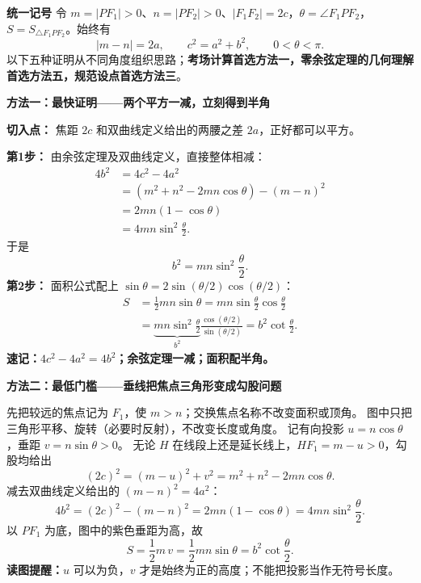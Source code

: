 \begin{proofbox}
\textbf{\textcolor{CProof}{统一记号}}
令 $m=|PF_1|>0$、$n=|PF_2|>0$、$|F_1F_2|=2c$，$\theta=\angle F_1PF_2$，$S=S_{\triangle F_1PF_2}$。始终有
\[
|m-n|=2a,\qquad c^2=a^2+b^2,\qquad 0<\theta<\pi.
\]
以下五种证明从不同角度组织思路；\textbf{考场计算首选方法一，零余弦定理的几何理解首选方法五，规范设点首选方法三}。

\medskip
\textbf{\textcolor{CProof}{方法一：最快证明——两个平方一减，立刻得到半角}}

\textbf{切入点：} 焦距 $2c$ 和双曲线定义给出的两腰之差 $2a$，正好都可以平方。

\textbf{第1步：} 由余弦定理及双曲线定义，直接整体相减：
\[
\begin{aligned}
4b^2
&=4c^2-4a^2\\
&=(m^2+n^2-2mn\cos\theta)-(m-n)^2\\
&=2mn(1-\cos\theta)\\
&=4mn\sin^2\frac{\theta}{2}.
\end{aligned}
\]
于是
\[\boxed{b^2=mn\sin^2\frac{\theta}{2}}.\]
\textbf{第2步：} 面积公式配上 $\sin\theta=2\sin(\theta/2)\cos(\theta/2)$：
\[
\begin{aligned}
S&=\tfrac12 mn\sin\theta
=mn\sin\tfrac\theta2\cos\tfrac\theta2\\
&=\underbrace{mn\sin^2\tfrac\theta2}_{b^2}
  \frac{\cos(\theta/2)}{\sin(\theta/2)}
=\boxed{b^2\cot\frac\theta2}.
\end{aligned}
\]
\textbf{速记：$4c^2-4a^2=4b^2$；余弦定理一减；面积配半角。}

\medskip
\end{proofbox}
\clearpage
\begin{proofbox}
\textbf{\textcolor{CProof}{方法二：最低门槛——垂线把焦点三角形变成勾股问题}}

先把较远的焦点记为 $F_1$，使 $m>n$；交换焦点名称不改变面积或顶角。
图中只把三角形平移、旋转（必要时反射），不改变长度或角度。
记有向投影 $u=n\cos\theta$，垂距 $v=n\sin\theta>0$。
无论 $H$ 在线段上还是延长线上，$HF_1=m-u>0$，勾股均给出
\[
 (2c)^2=(m-u)^2+v^2=m^2+n^2-2mn\cos\theta.
\]
减去双曲线定义给出的 $(m-n)^2=4a^2$：
\[
 4b^2=(2c)^2-(m-n)^2
 =2mn(1-\cos\theta)=4mn\sin^2\frac\theta2.
\]
以 $PF_1$ 为底，图中的紫色垂距为高，故
\[
 S=\frac12 m\,v=\frac12mn\sin\theta
 =\boxed{b^2\cot\frac\theta2}.
\]
\textbf{读图提醒：}$u$ 可以为负，$v$ 才是始终为正的高度；不能把投影当作无符号长度。
\end{proofbox}
\clearpage
